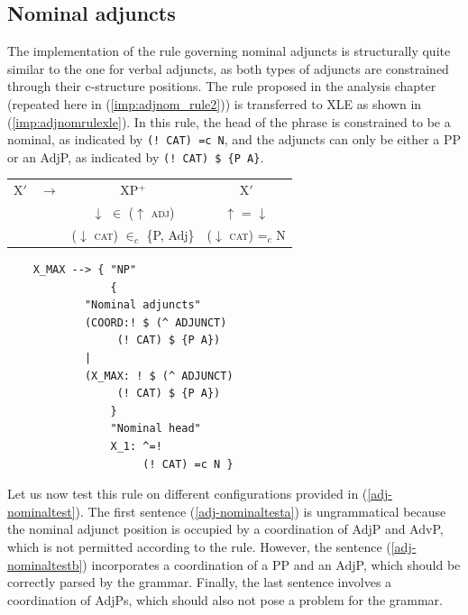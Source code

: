 \subsection{Nominal adjuncts}

\begin{sloppypar}
The implementation of the rule governing nominal adjuncts is structurally quite similar to the one for verbal adjuncts, as both types of adjuncts are constrained through their c-structure positions. The rule proposed in the analysis chapter (repeated here in (\ref{imp:adjnom_rule2})) is transferred to XLE as shown in (\ref{imp:adjnomrulexle}). In this rule, the head of the phrase is constrained to be a nominal, as indicated by \mbox{\texttt{(!\ CAT) =c N}}, and the adjuncts can only be either a PP or an AdjP, as indicated by \mbox{\texttt{(!\ CAT) \$ \{P A\}}}.
\end{sloppypar}

\pex
\vspace{-13pt}

\label{imp:adjnom_rule2}
\begin{tabular}{lccc}
	X$'$ & $\longrightarrow$ & XP$^{+}$ & X$'$ \\
	& & $\downarrow$ $\in$ ($\uparrow$ \textsc{adj}) & $\uparrow$ = $\downarrow$ \\
	&			   & ($\downarrow$ \textsc{cat}) $\in_{c}$ \{P, Adj\} & ($\downarrow$ \textsc{cat}) =$_{c}$ N  
\end{tabular}
\xe

\newpage 
\pex
\vspace{-19pt}
\label{imp:adjnomrulexle}

\begin{lstlisting}
	X_MAX --> {	"NP"
		        {
			"Nominal adjuncts"
			(COORD:! $ (^ ADJUNCT)
				 (! CAT) $ {P A})
			|
			(X_MAX: ! $ (^ ADJUNCT)
				 (! CAT) $ {P A})		
		        }
		        "Nominal head"
		        X_1: ^=!
		             (! CAT) =c N }
	\end{lstlisting}
	\xe

Let us now test this rule on different configurations provided in (\ref{adj-nominaltest}). The first sentence (\ref{adj-nominaltesta}) is ungrammatical because the nominal adjunct position is occupied by a coordination of AdjP and AdvP, which is not permitted according to the rule. However, the sentence (\ref{adj-nominaltestb}) incorporates a coordination of a PP and an AdjP, which should be correctly parsed by the grammar. Finally, the last sentence involves a coordination of AdjPs, which should also not pose a problem for the grammar.

